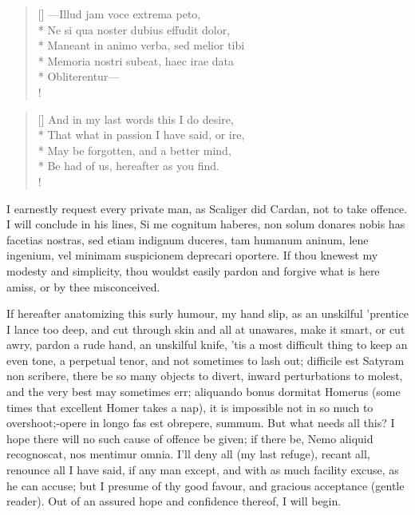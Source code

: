 {\settowidth{\versewidth}{Maneant in animo verba, sed melior tibi}
\begin{verse}[\versewidth]
---Illud jam voce extrema peto,\\*
Ne si qua noster dubius effudit dolor,\\*
Maneant in animo verba, sed melior tibi\\*
Memoria nostri subeat, haec irae data\\*
Obliterentur---\\!
\end{verse}

\settowidth{\versewidth}{That what in passion I have said, or ire,}
\begin{verse}[\versewidth]
And in my last words this I do desire,\\*
That what in passion I have said, or ire,\\*
May be forgotten, and a better mind,\\*
Be had of us, hereafter as you find.\\!
\end{verse}

I earnestly request every private man, as Scaliger did Cardan, not to
take offence. I will conclude in his lines, Si me cognitum haberes, non
solum donares nobis has facetias nostras, sed etiam indignum duceres,
tam humanum aninum, lene ingenium, vel minimam suspicionem deprecari
oportere. If thou knewest my modesty and simplicity, thou wouldst
easily pardon and forgive what is here amiss, or by thee misconceived.

If hereafter anatomizing this surly humour, my hand slip, as an
unskilful 'prentice I lance too deep, and cut through skin and all at
unawares, make it smart, or cut awry, pardon a rude hand, an
unskilful knife, 'tis a most difficult thing to keep an even tone, a
perpetual tenor, and not sometimes to lash out; difficile est Satyram
non scribere, there be so many objects to divert, inward perturbations
to molest, and the very best may sometimes err; aliquando bonus
dormitat Homerus (some times that excellent Homer takes a nap), it is
impossible not in so much to overshoot;-opere in longo fas est
obrepere, summum. But what needs all this? I hope there will no such
cause of offence be given; if there be, Nemo aliquid recognoscat,
nos mentimur omnia. I'll deny all (my last refuge), recant all,
renounce all I have said, if any man except, and with as much facility
excuse, as he can accuse; but I presume of thy good favour, and
gracious acceptance (gentle reader). Out of an assured hope and
confidence thereof, I will begin.

}
